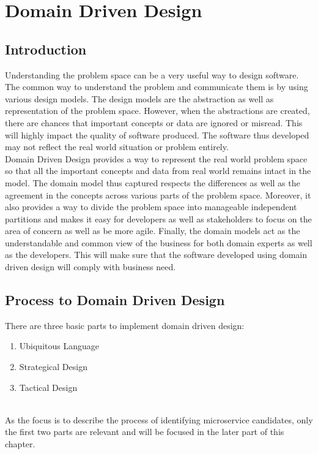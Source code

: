 \chapter{Domain Driven Design}\label{chapter:domain_driven_design}

\section{Introduction}\label{section:domain_driven_design/introduction}
Understanding the problem space can be a very useful way to design software. The common way to understand the problem and communicate them is by using various design models. The design models are the abstraction as well as representation of the problem space. However, when the abstractions are created, there are chances that important concepts or data are ignored or misread. This will highly impact the quality of software produced. The software thus developed may not reflect the real world situation or problem entirely.
\\
Domain Driven Design provides a way to represent the real world problem space so that all the important concepts and data from real world remains intact in the model. The domain model thus captured respects the differences as well as the agreement in the concepts across various parts of the problem space. Moreover, it also provides a way to divide the problem space into manageable independent partitions and makes it easy for developers as well as stakeholders to focus on the area of concern as well as be more agile. Finally, the domain models act as the understandable and common view of the business for both domain experts as well as the developers. This will make sure that the software developed using domain driven design will comply with business need.\cite{Evans:2003aa}\cite{Vernon:2013aa}
\\

\section{Process to Domain Driven Design}\label{section:domain_driven_design/process_to_domain_driven_design}
There are three basic parts to implement domain driven design:
\begin{enumerate}
\item{Ubiquitous Language}
\item{Strategical Design}
\item{Tactical Design}
\end{enumerate}
\\
As the focus is to describe the process of identifying microservice candidates, only the first two parts are relevant and will be focused in the later part of this chapter.
